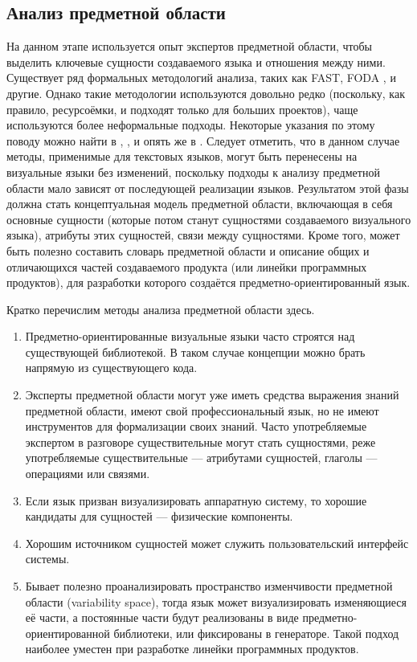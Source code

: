 \subsection{Анализ предметной области}
\label{chapterDomainAnalysis}
На данном этапе используется опыт экспертов предметной области, чтобы выделить ключевые 
сущности создаваемого языка и отношения между ними. Существует ряд формальных методологий 
анализа, таких как FAST, FODA
, и другие. Однако такие методологии используются довольно 
редко (поскольку, как правило, ресурсоёмки, и подходят только для больших проектов), 
чаще используются более неформальные подходы. Некоторые указания по этому поводу можно 
найти в \cite{mernik2005and}, \cite{voelter2009best}, \cite{luoma2004defining} и опять 
же в \cite{kelly2008domain}. Следует отметить, что в данном случае методы, применимые 
для текстовых языков, могут быть перенесены на визуальные языки без изменений, поскольку 
подходы к анализу предметной области мало зависят от последующей реализации языков. 
Результатом этой фазы должна стать концептуальная модель предметной области, включающая 
в себя основные сущности (которые потом станут сущностями создаваемого визуального языка), 
атрибуты этих сущностей, связи между сущностями. Кроме того, может быть полезно составить 
словарь предметной области и описание общих и отличающихся частей создаваемого продукта 
(или линейки программных продуктов), для разработки которого создаётся предметно-ориентированный 
язык.

Кратко перечислим методы анализа предметной области здесь.
\begin{enumerate}
	\item Предметно-ориентированные визуальные языки часто строятся над существующей 
		библиотекой. В таком случае концепции можно брать напрямую из существующего кода.
	\item Эксперты предметной области могут уже иметь средства выражения знаний предметной 
		области, имеют свой профессиональный язык, но не имеют инструментов для формализации 
		своих знаний. Часто употребляемые экспертом в разговоре существительные могут 
		стать сущностями, реже употребляемые существительные --- атрибутами сущностей, 
		глаголы --- операциями или связями. 
	\item Если язык призван визуализировать аппаратную систему, то хорошие кандидаты 
		для сущностей --- физические компоненты.
	\item Хорошим источником сущностей может служить пользовательский интерфейс системы.
	\item Бывает полезно проанализировать пространство изменчивости предметной области 
		(variability space), тогда язык может визуализировать изменяющиеся её части, а 
		постоянные части будут реализованы в виде предметно-ориентированной библиотеки, 
		или фиксированы в генераторе. Такой подход наиболее уместен при разработке линейки 
		программных продуктов.
\end{enumerate}

